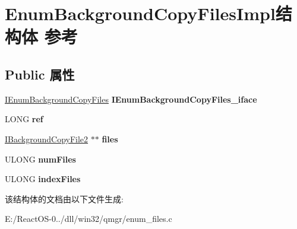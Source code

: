 \hypertarget{struct_enum_background_copy_files_impl}{}\section{Enum\+Background\+Copy\+Files\+Impl结构体 参考}
\label{struct_enum_background_copy_files_impl}
\subsection*{Public 属性}
\begin{DoxyCompactItemize}
\item 
\mbox{\label{struct_enum_background_copy_files_impl_ab79ed52a57cd9ac4ee52c36e23852749}} 
\hyperlink{interface_i_enum_background_copy_files}{I\+Enum\+Background\+Copy\+Files} {\bfseries I\+Enum\+Background\+Copy\+Files\+\_\+iface}
\item 
\mbox{\label{struct_enum_background_copy_files_impl_a608e4fa6edd5071e2003b2fd33cdbf8e}} 
L\+O\+NG {\bfseries ref}
\item 
\mbox{\label{struct_enum_background_copy_files_impl_a5b98171aee574e26d274dae4b78c0193}} 
\hyperlink{interface_i_background_copy_file2}{I\+Background\+Copy\+File2} $\ast$$\ast$ {\bfseries files}
\item 
\mbox{\label{struct_enum_background_copy_files_impl_a0fec593531db34b82877f820a7202ed0}} 
U\+L\+O\+NG {\bfseries num\+Files}
\item 
\mbox{\label{struct_enum_background_copy_files_impl_a33fee49b375e405c7885f20524c35235}} 
U\+L\+O\+NG {\bfseries index\+Files}
\end{DoxyCompactItemize}


该结构体的文档由以下文件生成\+:\begin{DoxyCompactItemize}
\item 
E\+:/\+React\+O\+S-\/0../dll/win32/qmgr/enum\+\_\+files.\+c\end{DoxyCompactItemize}
